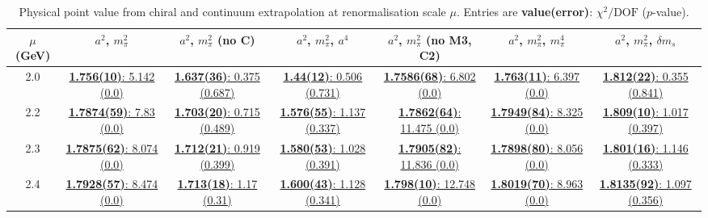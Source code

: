 \documentclass[12pt]{extarticle}
\begin{document}
\begin{table}[h!]
\begin{center}
\begin{tabular}{|c|c|c|c|c|c|c|}
\hline
$\mu$ (GeV) & $a^2$, $m_\pi^2$& $a^2$, $m_\pi^2$ (no C)& $a^2$, $m_\pi^2$, $a^4$& $a^2$, $m_\pi^2$ (no M3, C2)& $a^2$, $m_\pi^2$, $m_\pi^4$& $a^2$, $m_\pi^2$, $\delta m_s$\\
\hline
2.0& \hyperlink{SSmPP/NPR/a2m2_20.pdf.1}{\textbf{1.756(10)}: 5.142 (0.0)} & \hyperlink{SSmPP/NPR/a2m2noC_20.pdf.1}{\textbf{1.637(36)}: 0.375 (0.687)} & \hyperlink{SSmPP/NPR/a2a4m2_20.pdf.1}{\textbf{1.44(12)}: 0.506 (0.731)} & \hyperlink{SSmPP/NPR/a2m2mcut_20.pdf.1}{\textbf{1.7586(68)}: 6.802 (0.0)} & \hyperlink{SSmPP/NPR/a2m2m4_20.pdf.1}{\textbf{1.763(11)}: 6.397 (0.0)} & \hyperlink{SSmPP/NPR/a2m2delm_20.pdf.1}{\textbf{1.812(22)}: 0.355 (0.841)}\\
2.2& \hyperlink{SSmPP/NPR/a2m2_22.pdf.1}{\textbf{1.7874(59)}: 7.83 (0.0)} & \hyperlink{SSmPP/NPR/a2m2noC_22.pdf.1}{\textbf{1.703(20)}: 0.715 (0.489)} & \hyperlink{SSmPP/NPR/a2a4m2_22.pdf.1}{\textbf{1.576(55)}: 1.137 (0.337)} & \hyperlink{SSmPP/NPR/a2m2mcut_22.pdf.1}{\textbf{1.7862(64)}: 11.475 (0.0)} & \hyperlink{SSmPP/NPR/a2m2m4_22.pdf.1}{\textbf{1.7949(84)}: 8.325 (0.0)} & \hyperlink{SSmPP/NPR/a2m2delm_22.pdf.1}{\textbf{1.809(10)}: 1.017 (0.397)}\\
2.3& \hyperlink{SSmPP/NPR/a2m2_23.pdf.1}{\textbf{1.7875(62)}: 8.074 (0.0)} & \hyperlink{SSmPP/NPR/a2m2noC_23.pdf.1}{\textbf{1.712(21)}: 0.919 (0.399)} & \hyperlink{SSmPP/NPR/a2a4m2_23.pdf.1}{\textbf{1.580(53)}: 1.028 (0.391)} & \hyperlink{SSmPP/NPR/a2m2mcut_23.pdf.1}{\textbf{1.7905(82)}: 11.836 (0.0)} & \hyperlink{SSmPP/NPR/a2m2m4_23.pdf.1}{\textbf{1.7898(80)}: 8.056 (0.0)} & \hyperlink{SSmPP/NPR/a2m2delm_23.pdf.1}{\textbf{1.801(16)}: 1.146 (0.333)}\\
2.4& \hyperlink{SSmPP/NPR/a2m2_24.pdf.1}{\textbf{1.7928(57)}: 8.474 (0.0)} & \hyperlink{SSmPP/NPR/a2m2noC_24.pdf.1}{\textbf{1.713(18)}: 1.17 (0.31)} & \hyperlink{SSmPP/NPR/a2a4m2_24.pdf.1}{\textbf{1.600(43)}: 1.128 (0.341)} & \hyperlink{SSmPP/NPR/a2m2mcut_24.pdf.1}{\textbf{1.798(10)}: 12.748 (0.0)} & \hyperlink{SSmPP/NPR/a2m2m4_24.pdf.1}{\textbf{1.8019(70)}: 8.963 (0.0)} & \hyperlink{SSmPP/NPR/a2m2delm_24.pdf.1}{\textbf{1.8135(92)}: 1.097 (0.356)}\\
\hline
\end{tabular}
\caption{Physical point value from chiral and continuum extrapolation at renormalisation scale $\mu$. Entries are \textbf{value(error)}: $\chi^2/\text{DOF}$ ($p$-value).}
\end{center}
\end{table}
\end{document}
